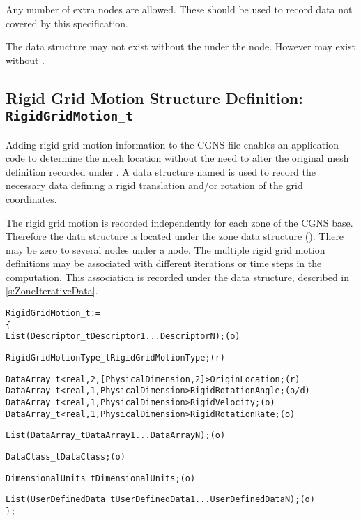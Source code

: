 Any number of extra  nodes are allowed.
These should be used to record data not covered by this specification.

The  data structure may not exist without
the  under the  node.
However  may exist without
.

\subsection{Rigid Grid Motion Structure Definition: \texttt{RigidGridMotion\_t}}
\label{s:RigidGridMotion}

Adding rigid grid motion information to the CGNS file enables an
application code to determine the mesh location without the need to
alter the original mesh definition recorded under .
A data structure named  is used to record the
necessary data defining a rigid translation and/or rotation of the grid
coordinates.

The rigid grid motion is recorded independently for each zone of the
CGNS base.
Therefore the  data structure is located under
the zone data structure ().
There may be zero to several  nodes under a
 node.
The multiple rigid grid motion definitions may be associated with
different iterations or time steps in the computation.
This association is recorded under the  data
structure, described in \autoref{s:ZoneIterativeData}.

\begin{alltt}
  RigidGridMotion\_t :=
    \{
    List( Descriptor\_t Descriptor1 ... DescriptorN ) ;                      (o)

    RigidGridMotionType\_t RigidGridMotionType ;                             (r)

    DataArray\_t<real, 2, [PhysicalDimension, 2]> OriginLocation ;           (r)
    DataArray\_t<real, 1,  PhysicalDimension>     RigidRotationAngle ;       (o/d)
    DataArray\_t<real, 1,  PhysicalDimension>     RigidVelocity ;            (o)
    DataArray\_t<real, 1,  PhysicalDimension>     RigidRotationRate ;        (o)

    List( DataArray\_t DataArray1 ... DataArrayN ) ;                         (o)

    DataClass\_t DataClass ;                                                 (o)

    DimensionalUnits\_t DimensionalUnits ;                                   (o)

    List( UserDefinedData\_t UserDefinedData1 ... UserDefinedDataN ) ;       (o)
    \} ;
\end{alltt}

